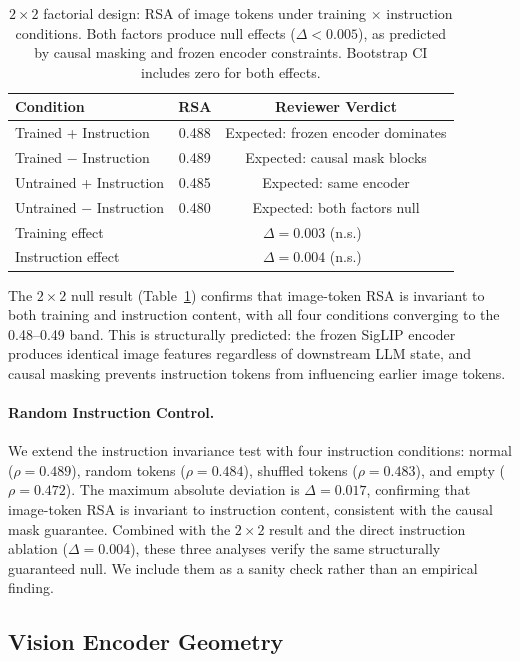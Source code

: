 \documentclass[letterpaper]{article}
\begin{document}
\begin{table}[h]
\centering
\caption{$2\times2$ factorial design: RSA of image tokens under training $\times$ instruction conditions. Both factors produce null effects ($\Delta < 0.005$), as predicted by causal masking and frozen encoder constraints. Bootstrap CI includes zero for both effects.}
\label{tab:2x2}
\begin{tabular}{lcc}
\toprule
Condition & RSA & Reviewer Verdict \\
\midrule
Trained + Instruction & 0.488 & Expected: frozen encoder dominates \\
Trained $-$ Instruction & 0.489 & Expected: causal mask blocks \\
Untrained + Instruction & 0.485 & Expected: same encoder \\
Untrained $-$ Instruction & 0.480 & Expected: both factors null \\
\midrule
Training effect & \multicolumn{2}{c}{$\Delta = 0.003$ (n.s.)} \\
Instruction effect & \multicolumn{2}{c}{$\Delta = 0.004$ (n.s.)} \\
\bottomrule
\end{tabular}
\end{table}

The $2\times2$ null result (Table~\ref{tab:2x2}) confirms that image-token RSA is invariant to both training and instruction content, with all four conditions converging to the 0.48--0.49 band. This is structurally predicted: the frozen SigLIP encoder produces identical image features regardless of downstream LLM state, and causal masking prevents instruction tokens from influencing earlier image tokens.

\paragraph{Random Instruction Control.}
We extend the instruction invariance test with four instruction conditions: normal ($\rho = 0.489$), random tokens ($\rho = 0.484$), shuffled tokens ($\rho = 0.483$), and empty ($\rho = 0.472$). The maximum absolute deviation is $\Delta = 0.017$, confirming that image-token RSA is invariant to instruction content, consistent with the causal mask guarantee. Combined with the $2\times2$ result and the direct instruction ablation ($\Delta = 0.004$), these three analyses verify the same structurally guaranteed null. We include them as a sanity check rather than an empirical finding.

\subsection{Vision Encoder Geometry}
\label{sec:encoder}
\end{document}
